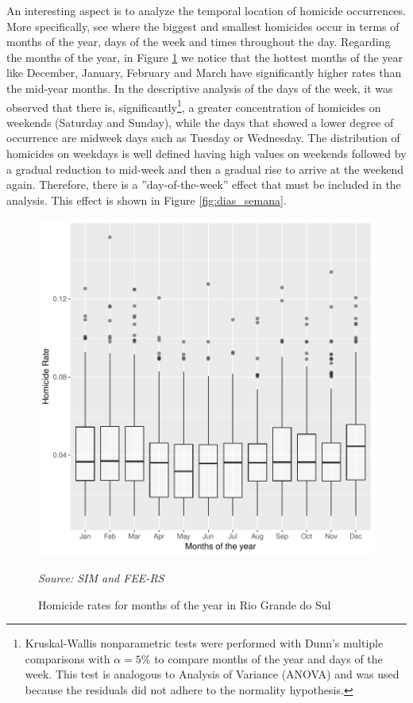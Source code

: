 \documentclass[12pt,openright,oneside,a4paper,english,french,spanish]{abntex2}
\numberwithin{table}{section} %
\numberwithin{figure}{section} %
\newcommand{\source}[1]{\textit{#1}}
\begin{document}
\begin{otherlanguage}{english}
An interesting aspect is to analyze the temporal location of homicide occurrences. More specifically, see where the biggest and smallest homicides occur in terms of months of the year, days of the week and times throughout the day. Regarding the months of the year, in Figure \ref{fig:meses_ano} we notice that the hottest months of the year like December, January, February and March have significantly higher rates than the mid-year months. In the descriptive analysis of the days of the week, it was observed that there is, significantly\footnote{Kruskal-Wallis nonparametric tests were performed with Dunn's multiple comparisons with $\alpha = 5\%$ to compare months of the year and days of the week. This test is analogous to Analysis of Variance (ANOVA) and was used because the residuals did not adhere to the normality hypothesis.}, a greater concentration of homicides on weekends (Saturday and Sunday), while the days that showed a lower degree of occurrence are midweek days such as Tuesday or Wednesday. The distribution of homicides on weekdays is well defined having high values on weekends followed by a gradual reduction to mid-week and then a gradual rise to arrive at the weekend again. Therefore, there is a ''day-of-the-week'' effect that must be included in the analysis. This effect is shown in Figure \ref{fig:dias_semana}.



\begin{figure}[H]
\begin{center}
\includegraphics{TESE_DE_DOUTORADO_RENAN_FINAL-plot_meses_HV}
\end{center}
\caption{Homicide rates for months of the year in Rio Grande do Sul}
\source{Source: SIM and FEE-RS}
\label{fig:meses_ano}
\end{figure}




\end{otherlanguage}
\end{document}
